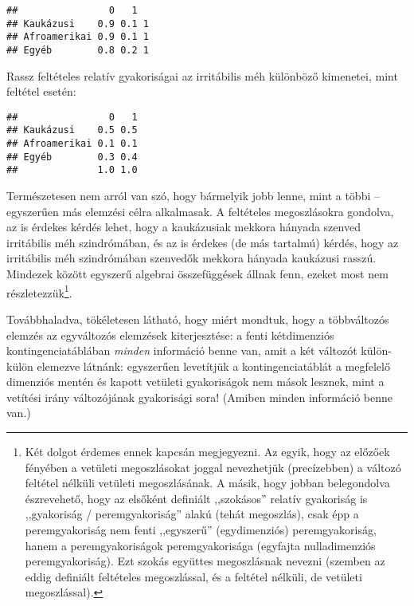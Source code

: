 \documentclass[]{book}
\newenvironment{Shaded}{\begin{snugshade}}{\end{snugshade}}
\newcommand{\DecValTok}[1]{\textcolor[rgb]{0.00,0.00,0.81}{#1}}
\newcommand{\KeywordTok}[1]{\textcolor[rgb]{0.13,0.29,0.53}{\textbf{#1}}}
\newcommand{\NormalTok}[1]{#1}
\newcommand{\OperatorTok}[1]{\textcolor[rgb]{0.81,0.36,0.00}{\textbf{#1}}}
\newcommand{\StringTok}[1]{\textcolor[rgb]{0.31,0.60,0.02}{#1}}
\let\rmarkdownfootnote\footnote%
\def\footnote{\protect\rmarkdownfootnote}
\begin{document}
\begin{verbatim}
##                0   1  
## Kaukázusi    0.9 0.1 1
## Afroamerikai 0.9 0.1 1
## Egyéb        0.8 0.2 1
\end{verbatim}

Rassz feltételes relatív gyakoriságai az irritábilis méh különböző kimenetei, mint feltétel esetén:

\begin{Shaded}
\end{Shaded}

\begin{verbatim}
##                0   1
## Kaukázusi    0.5 0.5
## Afroamerikai 0.1 0.1
## Egyéb        0.3 0.4
##              1.0 1.0
\end{verbatim}

Természetesen nem arról van szó, hogy bármelyik jobb lenne, mint a többi -- egyszerűen más elemzési célra alkalmasak. A feltételes megoszlásokra gondolva, az is érdekes kérdés lehet, hogy a kaukázusiak mekkora hányada szenved irritábilis méh szindrómában, és az is érdekes (de más tartalmú) kérdés, hogy az irritábilis méh szindrómában szenvedők mekkora hányada kaukázusi rasszú. Mindezek között egyszerű algebrai összefüggések állnak fenn, ezeket most nem részletezzük\footnote{Két dolgot érdemes ennek kapcsán megjegyezni. Az egyik, hogy az előzőek fényében a vetületi megoszlásokat joggal nevezhetjük (precízebben) a változó feltétel nélküli vetületi megoszlásának. A másik, hogy jobban belegondolva észrevehető, hogy az elsőként definiált ,,szokásos'' relatív gyakoriság is ,,gyakoriság / peremgyakoriság'' alakú (tehát megoszlás), csak épp a peremgyakoriság nem fenti ,,egyszerű'' (egydimenziós) peremgyakoriság, hanem a peremgyakoriságok peremgyakorisága (egyfajta nulladimenziós peremgyakoriság). Ezt szokás együttes megoszlásnak nevezni (szemben az eddig definiált feltételes megoszlással, és a feltétel nélküli, de vetületi megoszlással).}.

Továbbhaladva, tökéletesen látható, hogy miért mondtuk, hogy a többváltozós elemzés az egyváltozós elemzések kiterjesztése: a fenti kétdimenziós kontingenciatáblában \emph{minden} információ benne van, amit a két változót külön-külön elemezve látnánk: egyszerűen levetítjük a kontingenciatáblát a megfelelő dimenziós mentén és kapott vetületi gyakoriságok nem mások lesznek, mint a vetítési irány változójának gyakorisági sora! (Amiben minden információ benne van.)
\end{document}
